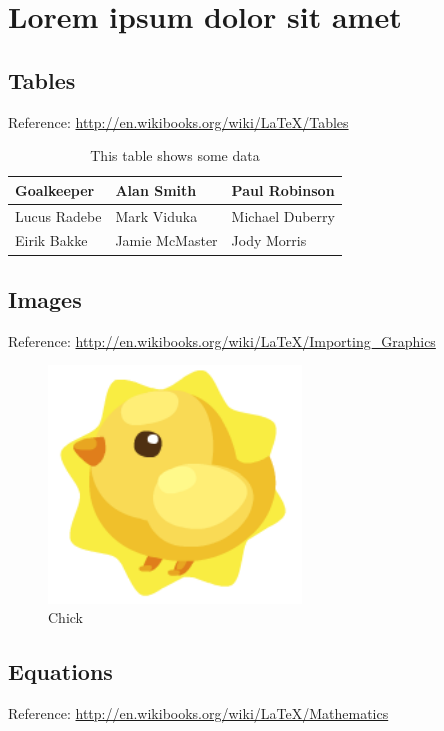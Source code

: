 \chapter{Lorem ipsum dolor sit amet}\label{chp:LABEL_CHP_2}

\section{Tables}\label{sec:LABEL_CHP_2_SEC_A}
Reference: \url{http://en.wikibooks.org/wiki/LaTeX/Tables}

\begin{table}[!h]
  \centering
  \begin{tabular}{ |l|l|l| }
    \hline
      Goalkeeper & Alan Smith & Paul Robinson \\
    \hline
      Lucus Radebe &  Mark Viduka & Michael Duberry \\
    \hline
      Eirik Bakke & Jamie McMaster & Jody Morris \\
    \hline
  \end{tabular}
  \caption{This table shows some data}
  \label{tab:LABEL_TAB_1}
\end{table}

\section{Images}\label{sec:LABEL_CHP_2_SEC_B}
Reference: \url{http://en.wikibooks.org/wiki/LaTeX/Importing_Graphics}

\begin{figure}
  \centering
  \includegraphics[width=0.6\textwidth]{imagens/chick.png}
  \caption{Chick}
  \label{fig:LABEL_FIG_1}
\end{figure}

\section{Equations}\label{sec:LABEL_CHP_2_SEC_C}
Reference: \url{http://en.wikibooks.org/wiki/LaTeX/Mathematics}

